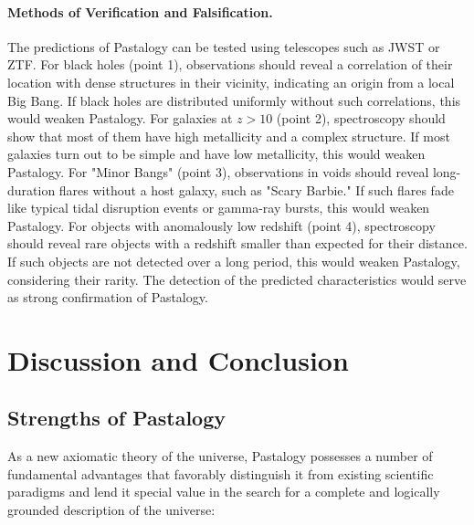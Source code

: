 \documentclass[pdflatex,sn-mathphys-num,referee]{sn-jnl}
\begin{document}
\paragraph{Methods of Verification and Falsification.} The predictions of Pastalogy can be tested using telescopes such as JWST or ZTF. For black holes (point 1), observations should reveal a correlation of their location with dense structures in their vicinity, indicating an origin from a local Big Bang. If black holes are distributed uniformly without such correlations, this would weaken Pastalogy. For galaxies at \( z > 10 \) (point 2), spectroscopy should show that most of them have high metallicity and a complex structure. If most galaxies turn out to be simple and have low metallicity, this would weaken Pastalogy. For "Minor Bangs" (point 3), observations in voids should reveal long-duration flares without a host galaxy, such as "Scary Barbie." If such flares fade like typical tidal disruption events or gamma-ray bursts, this would weaken Pastalogy. For objects with anomalously low redshift (point 4), spectroscopy should reveal rare objects with a redshift smaller than expected for their distance. If such objects are not detected over a long period, this would weaken Pastalogy, considering their rarity. The detection of the predicted characteristics would serve as strong confirmation of Pastalogy.

\section{Discussion and Conclusion}\label{sec:discussion-conclusion}

\subsection{Strengths of Pastalogy}\label{subsec:strengths}

As a new axiomatic theory of the universe, Pastalogy possesses a number of fundamental advantages that favorably distinguish it from existing scientific paradigms and lend it special value in the search for a complete and logically grounded description of the universe:
\end{document}
